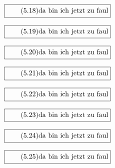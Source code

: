 \documentclass[11pt]{article}
\newcommand{\1}{ {\mathds{1}} }
\begin{document}
		\begin{equation}
			\boxed{
				\tag{5.18}
				\begin{split}
					\text{da bin ich jetzt zu faul}
				\end{split}
			}
		\end{equation}

		\begin{equation}
			\boxed{
				\tag{5.19}
				\begin{split}
					\text{da bin ich jetzt zu faul}
				\end{split}
			}
		\end{equation}

		\begin{equation}
			\boxed{
				\tag{5.20}
				\begin{split}
					\text{da bin ich jetzt zu faul}
				\end{split}
			}
		\end{equation}

		\begin{equation}
			\boxed{
				\tag{5.21}
				\begin{split}
					\text{da bin ich jetzt zu faul}
				\end{split}
			}
		\end{equation}

		\begin{equation}
			\boxed{
				\tag{5.22}
				\begin{split}
					\text{da bin ich jetzt zu faul}
				\end{split}
			}
		\end{equation}

		\begin{equation}
			\boxed{
				\tag{5.23}
				\begin{split}
					\text{da bin ich jetzt zu faul}
				\end{split}
			}
		\end{equation}

		\begin{equation}
			\boxed{
				\tag{5.24}
				\begin{split}
					\text{da bin ich jetzt zu faul}
				\end{split}
			}
		\end{equation}

		\begin{equation}
			\boxed{
				\tag{5.25}
				\begin{split}
					\text{da bin ich jetzt zu faul}
				\end{split}
			}
		\end{equation}
\end{document}
